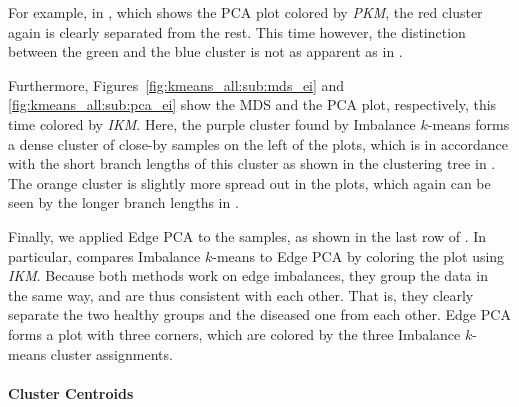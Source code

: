 For example, in ,
which shows the PCA plot colored by \emph{PKM}, the red cluster again is clearly separated from the rest.
This time however, the distinction between the green and the blue cluster
is not as apparent as in .

Furthermore, Figures~\ref{fig:kmeans_all:sub:mds_ei} and \ref{fig:kmeans_all:sub:pca_ei} show the MDS and the PCA plot,
respectively, this time colored by \emph{IKM}.
Here, the purple cluster found by Imbalance $k$-means forms a dense cluster of close-by samples on the left of the plots,
which is in accordance with the short branch lengths
of this cluster as shown in the clustering tree in .
The orange cluster is slightly more spread out in the plots,
which again can be seen by the longer branch lengths in .

Finally, we applied Edge PCA to the samples, as shown in the last row of .
In particular,  compares Imbalance $k$-means to Edge PCA
by coloring the plot using \emph{IKM}.
Because both methods work on edge imbalances, they group the data in the same way, and are thus consistent with each other.
That is, they clearly separate the two healthy groups and the diseased one from each other.
Edge PCA forms a plot with three corners, which are colored by the three Imbalance $k$-means cluster assignments.


\paragraph{Cluster Centroids}
\label{ch:Clustering:sec:Results:sub:BVDataset:par:ClusterCentroids}

